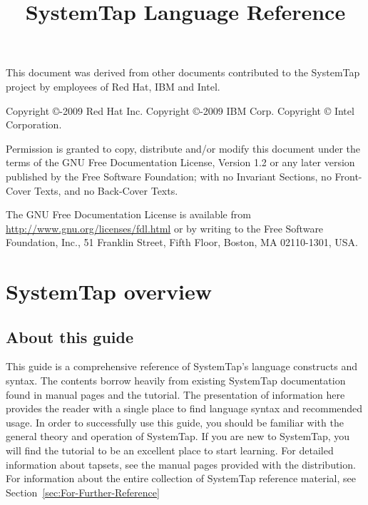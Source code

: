 \documentclass[twoside,english]{article}
\begin{document}
\title{SystemTap Language Reference}

\maketitle
\newpage{}
This document was derived from other documents contributed to the SystemTap project by employees of Red Hat, IBM and Intel.\newline

Copyright \copyright{}-2009 Red Hat Inc.\newline
Copyright \copyright{}-2009 IBM Corp.\newline
Copyright \copyright{} Intel Corporation.\newline

Permission is granted to copy, distribute and/or modify this document
under the terms of the GNU Free Documentation License, Version 1.2
or any later version published by the Free Software Foundation;
with no Invariant Sections, no Front-Cover Texts, and no Back-Cover Texts.\newline

The GNU Free Documentation License is available from
\url{http://www.gnu.org/licenses/fdl.html} or by writing to
the Free Software Foundation, Inc., 51 Franklin Street,
Fifth Floor, Boston, MA 02110-1301, USA.
\newpage{}
\tableofcontents{}
\listoftables
\newpage{}

\section{SystemTap overview\label{sec:SystemTap-Overview}}

\subsection{About this guide}

This guide is a comprehensive reference of SystemTap's language constructs
and syntax. The contents borrow heavily from existing SystemTap documentation
found in manual pages and the tutorial. The presentation of information here
provides the reader with a single place to find language syntax and recommended
usage. In order to successfully use this guide, you should be familiar with
the general theory and operation of SystemTap. If you are new to SystemTap,
you will find the tutorial to be an excellent place to start learning. For
detailed information about tapsets, see the manual pages provided with the
distribution. For information about the entire collection of SystemTap reference
material, see Section~\ref{sec:For-Further-Reference}
\end{document}
